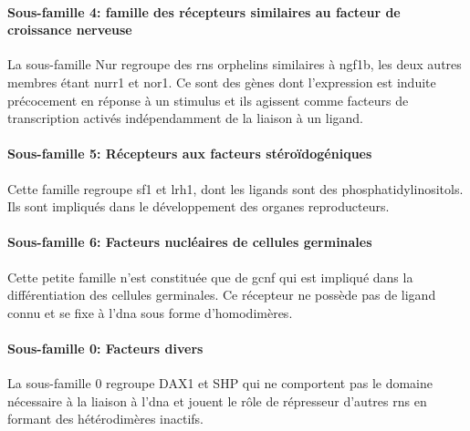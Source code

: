 \documentclass[../main.tex]{subfiles}
\begin{document}
			\paragraph{Sous-famille 4: famille des récepteurs similaires au facteur de croissance nerveuse}
				La sous-famille Nur regroupe des \glspl{rn} orphelins similaires à \gls{ngf1b}, les deux autres membres étant \gls{nurr1} et \gls{nor1}.
				Ce sont des gènes dont l'expression est induite précocement en réponse à un stimulus et ils agissent comme facteurs de transcription activés indépendamment de la liaison à un ligand.

			\paragraph{Sous-famille 5: Récepteurs aux facteurs stéroïdogéniques}
				Cette famille regroupe \gls{sf1} et \gls{lrh1}, dont les ligands sont des phosphatidylinositols.
				Ils sont impliqués dans le développement des organes reproducteurs.

			\paragraph{Sous-famille 6: Facteurs nucléaires de cellules germinales}
				Cette petite famille n'est constituée que de \gls{gcnf} qui est impliqué dans la différentiation des cellules germinales.
				Ce récepteur ne possède pas de ligand connu et se fixe à l'\gls{dna} sous forme d'homodimères.

			\paragraph{Sous-famille 0: Facteurs divers}
				La sous-famille 0 regroupe DAX1 et SHP qui ne comportent pas le domaine nécessaire à la liaison à l'\gls{dna} et jouent le rôle de répresseur d'autres \glspl{rn} en formant des hétérodimères inactifs.
\end{document}
